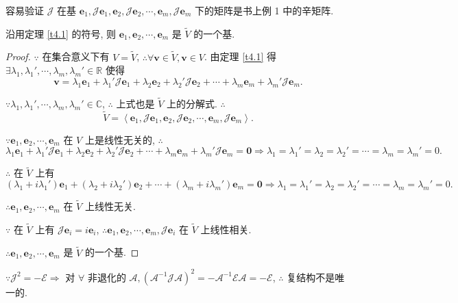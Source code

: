 \documentclass{ctexart}
\begin{document}
容易验证 $\mathcal{J}$ 在基 $\boldsymbol{e}_1,\mathcal{J}\boldsymbol{e}_1,\boldsymbol{e}_2,\mathcal{J}\boldsymbol{e}_2,\cdots,\boldsymbol{e}_m,\mathcal{J}\boldsymbol{e}_m$ 下的矩阵是书上例 1 中的辛矩阵.
\begin{theorem}
    沿用定理 \ref{t4.1} 的符号, 则 $\boldsymbol{e}_1,\boldsymbol{e}_2,\cdots,\boldsymbol{e}_m$ 是 $\widetilde{V}$ 的一个基.
\end{theorem}
\begin{proof}
    $\because$ 在集合意义下有 $V=\widetilde{V}$, $\therefore\forall\boldsymbol{v}\in\widetilde{V},\boldsymbol{v}\in V$. 由定理 \ref{t4.1} 得 $\exists\lambda_1,\lambda_1',\cdots,\lambda_m,\lambda_m'\in\mathbb{R}$ 使得
    \[\boldsymbol{v}=\lambda_1\boldsymbol{e}_1+\lambda_1'\mathcal{J}\boldsymbol{e}_1+\lambda_2\boldsymbol{e}_2+\lambda_2'\mathcal{J}\boldsymbol{e}_2+\cdots+\lambda_m\boldsymbol{e}_m+\lambda_m'\mathcal{J}\boldsymbol{e}_m.\]

    $\because\lambda_1,\lambda_1',\cdots,\lambda_m,\lambda_m'\in\mathbb{C}$, $\therefore$ 上式也是 $\widetilde{V}$ 上的分解式. $\therefore$
    \[\widetilde{V}=\left<\boldsymbol{e}_1,\mathcal{J}\boldsymbol{e}_1,\boldsymbol{e}_2,\mathcal{J}\boldsymbol{e}_2,\cdots,\boldsymbol{e}_m,\mathcal{J}\boldsymbol{e}_m\right>.\]

    $\because\boldsymbol{e}_1,\boldsymbol{e}_2,\cdots,\boldsymbol{e}_m$ 在 $V$ 上是线性无关的, $\therefore$
    \[\lambda_1\boldsymbol{e}_1+\lambda_1'\mathcal{J}\boldsymbol{e}_1+\lambda_2\boldsymbol{e}_2+\lambda_2'\mathcal{J}\boldsymbol{e}_2+\cdots+\lambda_m\boldsymbol{e}_m+\lambda_m'\mathcal{J}\boldsymbol{e}_m=\boldsymbol{0}\Rightarrow\lambda_1=\lambda_1'=\lambda_2=\lambda_2'=\cdots=\lambda_m=\lambda_m'=0.\]

    $\therefore$ 在 $\widetilde{V}$ 上有
    \[(\lambda_1+i\lambda_1')\boldsymbol{e}_1+(\lambda_2+i\lambda_2')\boldsymbol{e}_2+\cdots+(\lambda_m+i\lambda_m')\boldsymbol{e}_m=\boldsymbol{0}\Rightarrow\lambda_1=\lambda_1'=\lambda_2=\lambda_2'=\cdots=\lambda_m=\lambda_m'=0.\]

    $\therefore\boldsymbol{e}_1,\boldsymbol{e}_2,\cdots,\boldsymbol{e}_m$ 在 $\widetilde{V}$ 上线性无关.

    $\because$ 在 $\widetilde{V}$ 上有 $\mathcal{J}\boldsymbol{e}_i=i\boldsymbol{e}_i$, $\therefore\boldsymbol{e}_1,\boldsymbol{e}_2,\cdots,\boldsymbol{e}_m,\mathcal{J}\boldsymbol{e}_i$ 在 $\widetilde{V}$ 上线性相关.

    $\therefore\boldsymbol{e}_1,\boldsymbol{e}_2,\cdots,\boldsymbol{e}_m$ 是 $\widetilde{V}$ 的一个基.
\end{proof}
$\because\mathcal{J}^2=-\mathcal{E}\Rightarrow$ 对 $\forall$ 非退化的 $\mathcal{A},(\mathcal{A}^{-1}\mathcal{J}\mathcal{A})^2=-\mathcal{A}^{-1}\mathcal{E}\mathcal{A}=-\mathcal{E}$, $\therefore$ 复结构不是唯一的.
\end{document}

